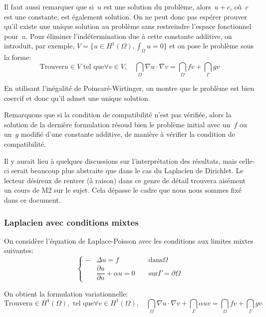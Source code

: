\medskip
Il faut aussi remarquer que si~$u$ est une solution du problème, alors~$u+c$,
où~$c$ est une constante, est également solution.
On ne peut donc pas espérer prouver qu'il existe une unique solution
au problème sans restreindre l'espace fonctionnel pour~$u$.
Pour éliminer l'indétermination due à cette constante additive, on introduit, par exemple, $V = \{u\in H^1(\Omega), \int_\Omega u=0\}$
et on pose le problème sous la forme:
\begin{equation}
\text{Trouver}u\in V \text{ tel que}
\forall v\in V,\quad \dint_\Omega \nabla u\cdot\nabla v = \dint_\Omega fv + \dint_\Gamma gv
\end{equation}

En utilisant l'inégalité de Poincaré-Wirtinger, on montre que le problème est bien
coercif et donc qu'il admet une unique solution.

\medskip
Remarquons que si la condition de compatibilité n'est pas vérifiée,
alors la solution de la dernière formulation résoud bien le problème initial avec
un~$f$ ou un~$g$ modifié d'une constante additive, de manière à vérifier
la condition de compatibilité.

\medskip
Il y aurait lieu à quelques discussions sur l'interprétation des résultats,
mais celle-ci serait beaucoup plus abstraite que dans le cas du Laplacien de Dirichlet.
Le lecteur désireux de rentrer (à raison) dans ce genre de détail trouvera
aisément un cours de M2 sur le sujet.
Cela dépasse le cadre que nous nous sommes fixé dans ce document.

\medskip
\subsubsection{Laplacien avec conditions mixtes}
On considère l'équation de Laplace-Poisson avec les conditions aux limites mixtes suivantes:
\begin{equation}\left\{\begin{aligned}
-&\Delta u=f &&\text{ dans} \Omega\\
&\dfrac{\partial u}{\partial n}+\alpha u=0 &&\text{ sur} \Gamma=\partial\Omega
\end{aligned}
\right.
\end{equation}

\medskip
On obtient la formulation variationnelle:
\begin{equation}
\text{Trouver}u\in H^1(\Omega), \text{ tel que}
\forall v\in H^1(\Omega),\quad \dint_\Omega \nabla u\cdot\nabla v +\dint_\Gamma \alpha u v = \dint_\Omega fv + \dint_\Gamma gv
\end{equation}

